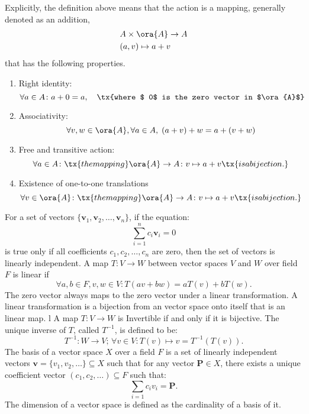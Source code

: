 \documentclass[a4paper,12pt]{article}
\begin{document}
Explicitly, the definition above means that the action is a mapping, generally denoted as an addition,
\[\begin{aligned}
& A\times\ora{A}\to A\\
& (a,v)\mapsto a+v
\end{aligned}\]
that has the following properties.
\begin{enumerate}
\item Right identity: \[\forall a\in A\colon a+0=a,\quad\tx{where $ 0$ is the zero vector in $\ora{A}$}\]
\item Associativity: \[\forall v,w\in \ora{A},\forall a\in A,\;(a+v)+w=a+(v+w)\]
\item Free and transitive action: \[\forall a\in A\colon \tx{the mapping }\ora{A}\to A\colon v\mapsto a+v\tx{ is a bijection.}\]
\item Existence of one-to-one translations \[\forall v\in \ora{A} \colon \tx{the mapping }\ora{A}\to A\colon v\mapsto a+v\tx{ is a bijection.}\]
\end{enumerate}
For a set of vectors \(\{\mathbf{v}_1,\mathbf{v}_2, \dots, \mathbf{v}_n\}\), if the equation:
\[\sum_{i=1}^nc_i\mathbf{v}_i = 0 \]
is true only if all coefficients \(c_1,c_2, \dots,c_n\) are zero, then the set of vectors is linearly independent.
A map $T\colon V\to W$ between vector spaces $V$ and $W$ over field $F$ is linear if
\[\forall a,b\in F,v,w\in V\colon T(av+bw)=aT(v)+bT(w).\]
The zero vector always maps to the zero vector under a linear transformation.
A linear transformation is a bijection from an vector space onto itself that is an linear map. l
A map $T\colon V\to W$ is Invertible if and only if it is bijective. The unique inverse of $T$, called $T^{-1}$, is defined to be:
\[T^{-1}\colon W\to V;\,\forall v\in V\colon T(v)\mapsto v=T^{-1}(T(v)).\]
The basis of a vector space $X$ over a field $F$ is a set of linearly independent vectors $\mathbf{v}=\{v_1,v_2,\dots\}\subseteq X$ such that for any vector $\mathbf{P}\in X$, there exists a unique coefficient vector $(c_1,c_2, \dots)\subseteq F$ such that:
\[\sum_{i=1}c_iv_i=\mathbf{P}.\]
The dimension of a vector space is defined as the cardinality of a basis of it.
\end{document}
